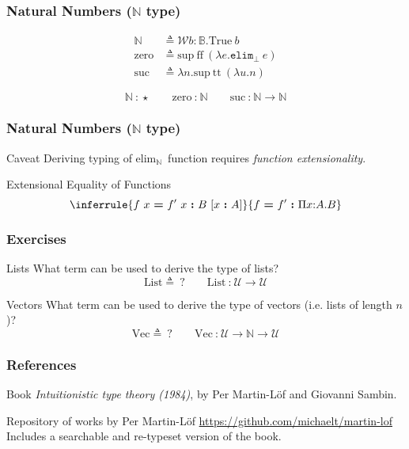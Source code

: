 \documentclass[mathserif,usenames,dvipsnames]{beamer}
\newcommand{\txt}[1]{\textrm{#1}}
\newcommand{\defeq}[0]{\ensuremath{\triangleq}}
\newcommand{\isterm}[2]{\ensuremath{#1 ~\textbf{{:}}~ #2}}
\newcommand{\eqterm}[3]{\ensuremath{#1 ~\textbf{=}~ #2 ~\textbf{{:}}~ #3}}
\newcommand{\hyps}[1]{\ensuremath{~[#1]}}
\newcommand{\hyp}[1]{\hyps{\isterm{x}{#1}}}
\newcommand{\Arr}[2]{\ensuremath{#1 \rightarrow #2}}
\newcommand{\Funv}[3]{\ensuremath{\Pi #1{:}#2. #3}}
\newcommand{\Fun}[2]{\Funv{x}{#1}{#2}}
\newcommand{\funv}[2]{\ensuremath{\lambda #1. #2}}
\newcommand{\fst}[1]{\ensuremath{\pi_1~#1}}
\newcommand{\Type}[0]{\ensuremath{\mathcal{U}}}
\newcommand{\Bot}[0]{\ensuremath{\bot}}
\newcommand{\elimBot}[1]{\ensuremath{\texttt{elim}_{\Bot}~#1}}
\newcommand{\Truek}[0]{\txt{True}}
\newcommand{\True}[1]{\ensuremath{\Truek~#1}}
\newcommand{\Bool}[0]{\ensuremath{\mathbb{B}}}
\newcommand{\true}[0]{\ensuremath{\txt{tt}}}
\newcommand{\false}[0]{\ensuremath{\txt{ff}}}
\newcommand{\elimBool}[3]{\ensuremath{\texttt{elim}_{\Bool}~#1~#2~#3}}
\newcommand{\Listk}[0]{\ensuremath{\txt{List}}}
\newcommand{\Vectk}[0]{\ensuremath{\txt{Vec}}}
\newcommand{\Nat}[0]{\ensuremath{\mathbb{N}}}
\newcommand{\zero}[0]{\ensuremath{\txt{zero}}}
\newcommand{\suck}[0]{\ensuremath{\txt{suc}}}
\newcommand{\elimNatk}[0]{\ensuremath{\txt{elim}_\Nat}}
\newcommand{\elimNat}[3]{\ensuremath{\elimNatk~#1~#2~#3}}
\newcommand{\Wellk}[0]{\ensuremath{\mathcal{W}}}
\newcommand{\Wellv}[3]{\ensuremath{\Wellk #1{:}#2. #3}}
\newcommand{\suprk}[0]{\ensuremath{\txt{sup}}}
\newcommand{\supr}[2]{\suprk~#1~#2}
\begin{document}
\begin{frame}
\frametitle{Natural Numbers ($\Nat$ type)}

\begin{align*}
\Nat &\defeq \Wellv{b}{\Bool}{\True{b}} \\
\zero &\defeq \supr{\false}{(\funv{e}{\elimBot{e}})} \\
\suck &\defeq \funv{n}{\supr{\true}{(\funv{u}{n})}}
\end{align*}

$$
\isterm{\Nat}{\star}
\qquad
\isterm{\zero}{\Nat}
\qquad
\isterm{\suck}{\Arr{\Nat}{\Nat}}
$$

\end{frame}

\begin{frame}
\frametitle{Natural Numbers ($\Nat$ type)}

\begin{block}{Caveat}
Deriving typing of \elimNatk~function requires \textit{function extensionality}.
\end{block}

\begin{block}{Extensional Equality of Functions}
$$
\inferrule{
  {\eqterm{f~x}{f'~x}{B} \hyp{A}}
}
{\eqterm{f}{f'}{\Fun{A}{B}}}
$$
\end{block}

\end{frame}

\begin{frame}
\frametitle{Exercises}

\begin{block}{Lists}
What term can be used to derive the type of lists?
$$
\Listk \defeq ~?
\qquad
\isterm{\Listk}{\Arr{\Type}{\Type}}
$$
\end{block}

\begin{block}{Vectors}
What term can be used to derive the type of
vectors (i.e. lists of length $n$)?
$$
\Vectk \defeq ~?
\qquad
\isterm{\Vectk}{\Arr{\Type}{\Arr{\Nat}{\Type}}}
$$
\end{block}

\end{frame}

\begin{frame}
\frametitle{References}

\begin{block}{Book}
\textit{Intuitionistic type theory (1984)}, by
Per Martin-L{\"o}f and Giovanni Sambin.
\end{block}

\begin{block}{Repository of works by Per Martin-L{\"o}f}
\url{https://github.com/michaelt/martin-lof}\\
Includes a searchable and re-typeset version of the book.
\end{block}

\end{frame}
\end{document}
